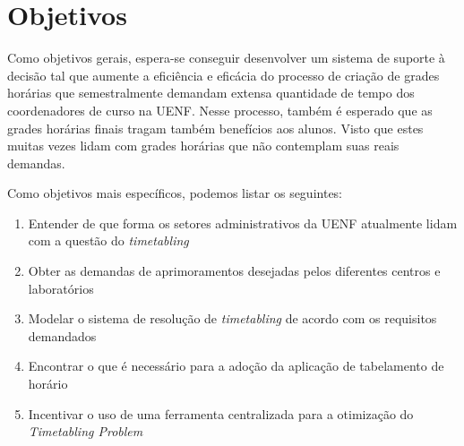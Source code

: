 \chapter{Objetivos}

Como objetivos gerais, espera-se conseguir desenvolver um sistema de suporte à decisão tal que aumente a eficiência e eficácia do processo de criação de grades horárias que semestralmente demandam extensa quantidade de tempo dos coordenadores de curso na UENF. Nesse processo, também é esperado que as grades horárias finais tragam também benefícios aos alunos. Visto que estes muitas vezes lidam com grades horárias que não contemplam suas reais demandas.

Como objetivos mais específicos, podemos listar os seguintes:

\begin{enumerate}
  \item Entender de que forma os setores administrativos da UENF atualmente lidam com a questão do \textit{timetabling}
  \item Obter as demandas de aprimoramentos desejadas pelos diferentes centros e laboratórios
  \item Modelar o sistema de resolução de \textit{timetabling} de acordo com os requisitos demandados
  \item Encontrar o que é necessário para a adoção da aplicação de tabelamento de horário
  \item Incentivar o uso de uma ferramenta centralizada para a otimização do \textit{Timetabling Problem}
\end{enumerate}
